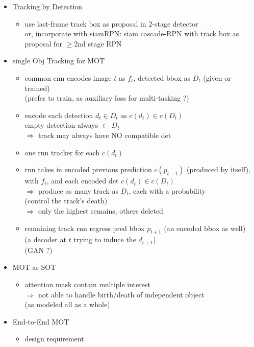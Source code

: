 \begin{itemize}
\begin{itemize}
	\item \underline{Tracking by Detection}
		\begin{itemize}
		\item use last-frame track box as proposal in 2-stage detector \\
		or, incorporate with siamRPN: siam cascade-RPN with track box as proposal for $\ge$2nd stage RPN
		\end{itemize}
	\item single Obj Tracking for MOT
		\begin{itemize}
		\item common cnn encodes image $t$ as $f_t$, detected bbox as $D_t$ (given or trained) \\
		(prefer to train, as auxiliary loss for multi-tasking ?)
		\item encode each detection $d_t \in D_t$ as $c(d_t) \in c(D_t)$ \\
		empty detection always $\in$ $D_t$ \\
		$\Rightarrow$ track may always have NO compatible det
		\item one rnn tracker for each $c(d_t)$
		\item rnn takes in encoded previous prediction $c(p_{t-1})$ (produced by itself), with $f_t$, and each encoded det $c(d_t) \in c(D_t)$ \\
		$\Rightarrow$ produce as many track as $D_t$, each with a probability \\ 
		(control the track's death) \\
		$\Rightarrow$ only the highest remains, others deleted
		\item remaining track rnn regress pred bbox $p_{t+1}$ (an encoded bbox as well) \\
		(a decoder at $t$ trying to induce the $d_{t+1}$) \\
		(GAN ?)
		\end{itemize}
	\item MOT as SOT
		\begin{itemize}
		\item attention mask contain multiple interest \\
		$\Rightarrow$ not able to handle birth/death of independent object \\
		(as modeled all as a whole)
		\end{itemize}
	\item End-to-End MOT
		\begin{itemize}
		\item design requirement
			\begin{itemize}

\end{itemize}
\end{itemize}
\end{itemize}
\end{itemize}
